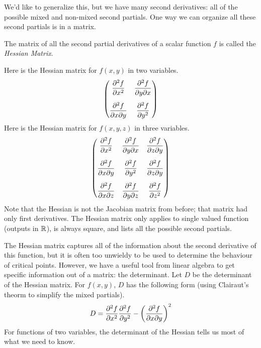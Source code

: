 \documentclass[fleqn,letterpaper]{report}
\begin{document}
We'd like to generalize this, but we have many second
derivatives: all of the possible mixed and non-mixed second
partials. One way we can organize all these second partials
is in a matrix.

\begin{defn}
The matrix of all the second partial derivatives of a scalar
function $f$ is called the \emph{Hessian Matrix}. 
\end{defn}

Here is the Hessian matrix for $f(x,y)$ in two variables. 
\begin{equation*}
\left( \begin{matrix}
\dfrac{\del^2 f}{\del x^2} &
\dfrac{\del^2 f}{\del y \del x} \vspace{0.3cm}\\
\dfrac{\del^2 f}{\del x \del y} &
\dfrac{\del^2 f}{\del y^2}
\end{matrix} \right) 
\end{equation*}
Here is the Hessian matrix for $f(x,y,z)$ in three variables. 
\begin{equation*}
\left( \begin{matrix}
\dfrac{\del^2 f}{\del x^2} &
\dfrac{\del^2 f}{\del y \del x} &
\dfrac{\del^2 f}{\del z \del y} \vspace{0.3cm}\\
\dfrac{\del^2 f}{\del x \del y} &
\dfrac{\del^2 f}{\del y^2} &
\dfrac{\del^2 f}{\del z \del y} \vspace{0.3cm}\\
\dfrac{\del^2 f}{\del x \del z} &
\dfrac{\del^2 f}{\del y \del z} &
\dfrac{\del^2 f}{\del z^2} 
\end{matrix} \right) 
\end{equation*}
Note that the Hessian is not the Jacobian matrix from before;
that matrix had only first derivatives. The Hessian matrix
only applies to single valued function (outputs in $\mathbb{R}$), is
always square, and lists all the possible second partials. 

The Hessian matrix captures all of the information about the
second derivative of this function, but it is often too
unwieldy to be used to determine the behaviour of critical
points. However, we have a useful tool from linear algebra to
get specific information out of a matrix: the determinant. Let
$D$ be the determinant of the Hessian matrix. For $f(x,y)$,
$D$ has the following form (using Clairaut's theorm to
simplify the mixed partials). 
\begin{equation*}
D = \frac{\partial^2 f}{\partial x^2} \frac{\partial^2 f}{\partial y^2} -
\left( \frac{\partial^2 f}{\partial x \partial y} \right)^2
\end{equation*}
For functions of two variables, the determinant of the Hessian
tells us most of what we need to know.
\end{document}
